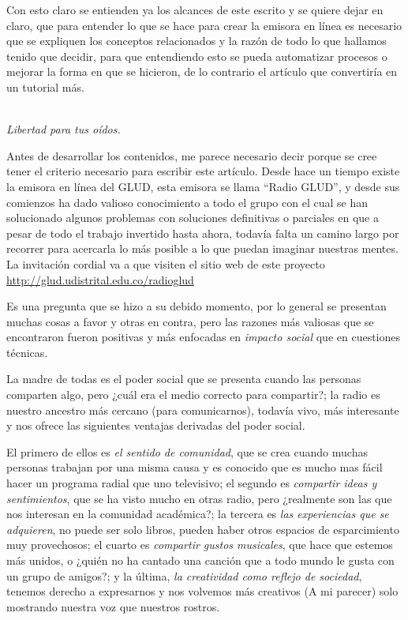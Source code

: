 \begin{multicols}{2}
Con esto claro se entienden ya los alcances de este escrito y se quiere dejar en claro, que para entender lo que se hace para crear la emisora en línea es necesario que se expliquen los conceptos relacionados y la razón de todo lo que hallamos tenido que decidir, para que entendiendo esto se pueda automatizar procesos o mejorar la forma en que se hicieron, de lo contrario el artículo que convertiría en un tutorial más.

\begin{entradilla} %
{\em {\color{introcolor}{Radio GLUD}} \\ Libertad para tus oídos.}
\end{entradilla}

Antes de desarrollar los contenidos, me parece necesario decir porque se cree tener el criterio necesario para escribir este artículo. Desde hace un tiempo existe la emisora en línea del GLUD, esta emisora se llama ``Radio GLUD'', y desde sus comienzos ha dado valioso conocimiento a todo el grupo con el cual se han solucionado algunos problemas con soluciones definitivas o parciales en que a pesar de todo el trabajo invertido hasta ahora, todavía falta un camino largo por recorrer para acercarla lo más posible a lo que puedan imaginar nuestras mentes.
La invitación cordial va a que visiten el sitio web de este proyecto \url{http://glud.udistrital.edu.co/radioglud}



Es una pregunta que se hizo a su debido momento, por lo general se presentan muchas cosas a favor y otras en contra, pero las razones más valiosas que se encontraron fueron positivas y más enfocadas en {\em impacto social} que en cuestiones técnicas. 



La madre de todas es el poder social que se presenta cuando las personas comparten algo, pero ¿cuál era el medio correcto para compartir?; la radio es nuestro ancestro más cercano (para comunicarnos), todavía vivo, más interesante y nos ofrece las siguientes ventajas derivadas del poder social.

El primero de ellos es {\em el sentido de comunidad}, que se crea cuando muchas personas trabajan por una misma causa y es conocido que es mucho mas fácil hacer un programa radial que uno televisivo; el segundo es {\em compartir ideas y sentimientos}, que se ha visto mucho en otras radio, pero ¿realmente son las que nos interesan en la comunidad académica?; la tercera es {\em las experiencias que se adquieren}, no puede ser solo libros, pueden haber otros espacios de esparcimiento muy provechosos; el cuarto es {\em compartir gustos musicales}, que hace que estemos más unidos, o ¿quién no ha cantado una canción que a todo mundo le gusta con un grupo de amigos?; y la última, {\em la creatividad como reflejo de sociedad}, tenemos derecho a expresarnos y nos volvemos más creativos (A mi parecer) solo mostrando nuestra voz que nuestros rostros.


\end{multicols}
